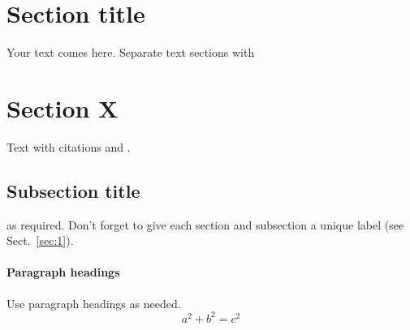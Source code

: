 \section{Section title}
\label{sec:10}
Your text comes here. Separate text sections with
\section{Section X}
\label{sec:x}
Text with citations \cite{RefB} and \cite{RefJ}.
\subsection{Subsection title}
\label{sec:20}
as required. Don't forget to give each section 
and subsection a unique label (see Sect.~\ref{sec:1}).
\paragraph{Paragraph headings} Use paragraph headings as needed.
\begin{equation}
a^2+b^2=c^2
\end{equation}

